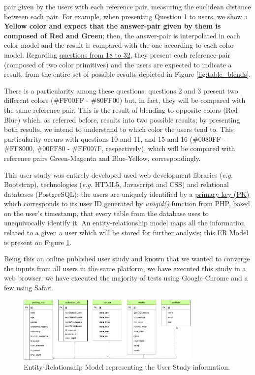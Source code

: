 pair given by the users with each reference pair, measuring the euclidean distance between each pair. For example, when presenting Question 1 to users,
we show a \textbf{Yellow color and expect that the answer-pair given by them is composed of Red and Green}; then, the answer-pair is interpolated in each
color model and the result is compared with the one according to each color model. Regarding \ul{questions from 18 to 32}, they present each reference-pair
(composed of two color primitives) and the users are expected to indicate a result, from the entire set of possible results depicted in Figure
\ref{fig:table_blends}. \par
%
There is a particularity among these questions: questions 2 and 3 present two different colors (\#FF00FF - \#80FF00) but, in fact, they will be compared with
the same reference pair. This is the result of blending to opposite colors (Red-Blue) which, as referred before, results into two possible results; by
presenting both results, we intend to understand to which color the users tend to. This particularity occurs with questions 10 and 11, and 15 and 16
(\#0080FF - \#FF8000, \#00FF80 - \#FF007F, respectively), which will be compared with reference pairs Green-Magenta and Blue-Yellow, correspondingly. \par
%
This user study was entirely developed used web-development libraries (\emph{e.g.} Bootstrap), technologies (\emph{e.g.} HTML5, Javascript
and CSS) and relational databases (PostgreSQL): the users are uniquely identified by a \ul{primary key (PK)} which corresponds to its user ID generated
by \emph{uniqid()} function from PHP, based on the user's timestamp, that every table from the database uses to unequivocally identify it.
An entity-relationship model maps all the information related to a given a user which will be stored for further analysis; this ER Model is present on
Figure \ref{fig:er_model}. \par
%
Being this an online published user study and known that we wanted to converge the inputs from all users in the same platform, we have executed this study
in a web browser: we have executed the majority of tests using Google Chrome and a few using Safari.
%
\begin{figure}[htbp]
	\centering
  \includegraphics[width=0.8\textwidth]{images/implementation/tables_schema.png}
  \caption[Entity-Relationship Model representing the User Study information.]{Entity-Relationship Model representing the User Study information.}
  \label{fig:er_model}
\end{figure}
%
%
